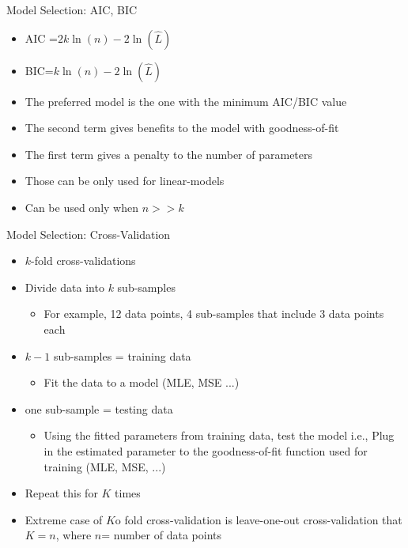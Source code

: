 \begin{frame}{Model Selection: AIC, BIC}
\begin{itemize}
    \item AIC =$2k\ln(n)-2\ln({\widehat {L}})$
    \item BIC=$k\ln(n)-2\ln({\widehat {L}})$
\end{itemize}

\bigskip
\begin{itemize}
    \item The preferred model is the one with the minimum AIC/BIC value
    \item The second term gives benefits to the model with goodness-of-fit
    \item The first term gives a penalty to the number of parameters
    \item Those can be only used for linear-models
    \item Can be used only when $n>>k$
\end{itemize}
\end{frame}

\begin{frame}{Model Selection: Cross-Validation}
\begin{itemize}
    \item $k$-fold cross-validations
    \item Divide data into $k$ sub-samples
    \begin{itemize}
        \item For example, 12 data points, 4 sub-samples that include 3 data points each
    \end{itemize}
    \item $k-1$ sub-samples = training data
    \begin{itemize}
        \item Fit the data to a model (MLE, MSE ...)
    \end{itemize}
    \item one sub-sample = testing data
    \begin{itemize}
        \item Using the fitted parameters from training data, test the model i.e., Plug in the estimated parameter to the goodness-of-fit function used for training (MLE, MSE, ...)
    \end{itemize}
    \item Repeat this for $K$ times
    \item Extreme case of $K$o fold cross-validation is leave-one-out cross-validation that $K=n$, where $n$= number of data points
\end{itemize}
\end{frame}

